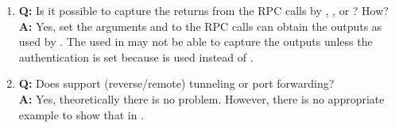 \begin{enumerate}
\item {\bf\color{blue} Q:}
      Is it possible to capture the returns from the RPC calls
      by , , or ? How? \\
      {\bf\color{blue} A:}
      Yes, set the arguments  and 
      to the RPC calls can obtain the outputs as used by .
      The  used in  may not be able to capture
      the outputs unless the authentication is set because 
      is used instead of .

\item {\bf\color{blue} Q:}
      Does  support  (reverse/remote) tunneling or
      port forwarding? \\
      {\bf\color{blue} A:}
      Yes, theoretically there is no problem. However, there is no
      appropriate example to show that in .

\end{enumerate}

